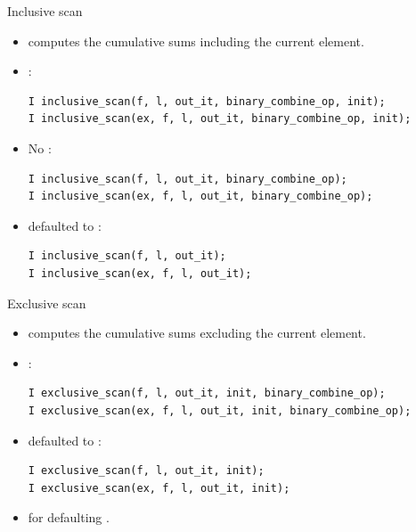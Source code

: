 \begin{frame}[t,fragile]{Inclusive scan}
\begin{itemize}
  \item {} computes the cumulative sums including the current element.

  \item {}:
\begin{lstlisting}
I inclusive_scan(f, l, out_it, binary_combine_op, init);
I inclusive_scan(ex, f, l, out_it, binary_combine_op, init);
\end{lstlisting}

  \item No :
\begin{lstlisting}
I inclusive_scan(f, l, out_it, binary_combine_op);
I inclusive_scan(ex, f, l, out_it, binary_combine_op);
\end{lstlisting}

  \item {} defaulted to :
\begin{lstlisting}
I inclusive_scan(f, l, out_it);
I inclusive_scan(ex, f, l, out_it);
\end{lstlisting}
\end{itemize}
\end{frame}

\begin{frame}[t,fragile]{Exclusive scan}
\begin{itemize}
  \item {} computes the cumulative sums excluding the current element.

  \item {}:
\begin{lstlisting}
I exclusive_scan(f, l, out_it, init, binary_combine_op);
I exclusive_scan(ex, f, l, out_it, init, binary_combine_op);
\end{lstlisting}

  \item {} defaulted to :
\begin{lstlisting}
I exclusive_scan(f, l, out_it, init);
I exclusive_scan(ex, f, l, out_it, init);
\end{lstlisting}

  \item {} for defaulting .
\end{itemize}
\end{frame}